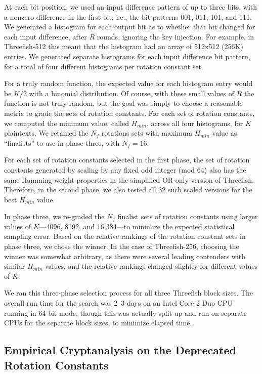 \documentclass[11pt,twoside]{article}
\begin{document}
At each bit position, we used an input difference pattern of up to three bits, with a nonzero difference in the first bit; i.e., the bit patterns 001, 011, 101, and 111.  We generated a histogram for each output bit as to whether that bit changed for each input difference, after $R$ rounds, ignoring the key injection.  For example, in Threefish-512 this meant that the histogram had an array of 512x512 (256K) entries. We generated separate histograms for each input difference bit pattern, for a total of four different histograms per rotation constant set.

For a truly random function, the expected value for each histogram entry would be $K/2$ with a binomial distribution.  Of course, with these small values of $R$ the function is not truly random, but the goal was simply to choose a reasonable metric to grade the sets of rotation constants.  For each set of rotation constants, we computed the minimum value, called $H_{min}$, across all four histograms, for $K$ plaintexts.  We retained the $N_f$ rotations sets with maximum $H_{min}$ value as ``finalists'' to use in phase three, with $N_f=16$.

For each set of rotation constants selected in the first phase, the set of rotation constants generated by scaling by any fixed odd integer (mod 64) also has the same Hamming weight properties in the simplified OR-only version of Threefish.  Therefore, in the second phase, we also tested all 32 such scaled versions for the best $H_{min}$ value.

In phase three, we re-graded the $N_f$ finalist sets of rotation constants using larger values of $K$---4096, 8192, and 16,384---to minimize the expected statistical sampling error.  Based on the relative rankings of the rotation constant sets in phase three, we chose the winner. In the case of Threefish-256, choosing the winner was somewhat arbitrary, as there were several leading contenders with similar $H_{min}$ values, and the relative rankings changed slightly for different values of $K$.

We ran this three-phase selection process for all three Threefish block sizes.  The overall run time for the search was 2--3 days on an Intel Core 2 Duo CPU running in 64-bit mode, though this was actually split up and run on separate CPUs for the separate block sizes, to minimize elapsed time.

\subsection{Empirical Cryptanalysis on the Deprecated Rotation Constants}
\end{document}
